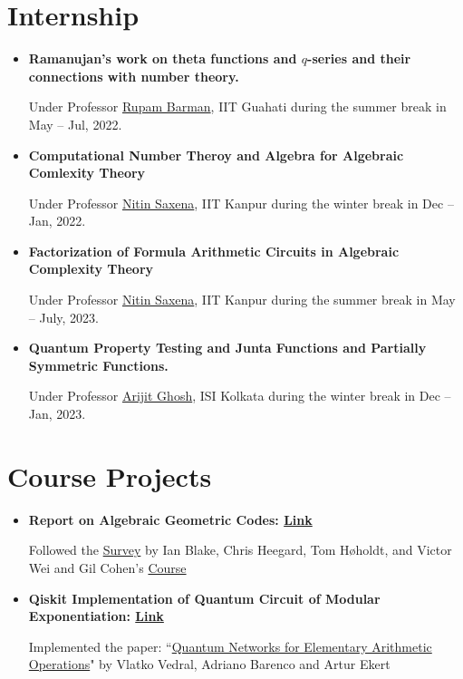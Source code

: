 \documentclass[10pt,a4paper,sans,colorlinks]{moderncv}        %
\begin{document}
\section{Internship}
\begin{itemize}
	\item \textbf{Ramanujan's work on theta functions and $q$-series and their connections with number theory.}

	      \hfill Under Professor \href{https://www.iitg.ac.in/rupam/}{Rupam Barman}, IIT Guahati during the summer break in May -- Jul, 2022.

	\item \textbf{Computational Number Theroy and Algebra for Algebraic Comlexity Theory }

	      \hfill Under Professor \href{https://www.cse.iitk.ac.in/users/nitin/}{Nitin Saxena}, IIT Kanpur during the winter break in Dec -- Jan, 2022.
	      
	\item \textbf{Factorization of Formula Arithmetic Circuits in Algebraic Complexity Theory }
	
	\hfill Under Professor \href{https://www.cse.iitk.ac.in/users/nitin/}{Nitin Saxena}, IIT Kanpur during the summer break in May -- July, 2023.
	\item \textbf{Quantum Property Testing and Junta Functions and Partially Symmetric Functions.}
	
	\hfill Under Professor \href{https://sites.google.com/site/homepagearijitghosh/}{Arijit Ghosh}, ISI Kolkata during the winter break in Dec -- Jan, 2023.
\end{itemize}
\section{Course Projects}
\begin{itemize}
	\item \textbf{Report on Algebraic Geometric Codes: \href{https://sohamch08.github.io//files/act-report.pdf}{Link}}
	
	\hfill Followed the \href{https://dl.acm.org/doi/abs/10.5555/334156.334207}{Survey} by Ian Blake, Chris Heegard, Tom Høholdt, and Victor Wei and Gil Cohen's \href{https://www.gilcohen.org/2022-ag-codes}{Course} 
	\item \textbf{Qiskit Implementation of Quantum Circuit of Modular Exponentiation: \href{https://github.com/bluecheese123/-Best_Project-}{Link}}
	
	\hfill Implemented the paper: ``\href{https://arxiv.org/pdf/quant-ph/9511018.pdf}{Quantum Networks for Elementary Arithmetic Operations}" by Vlatko Vedral, Adriano Barenco and Artur Ekert 
\end{itemize}
\end{document}
